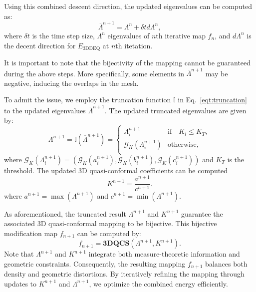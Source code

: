 \documentclass{article}
\begin{document}
Using this combined descent direction, the updated eigenvalues can be computed as:
\begin{equation}
    \overline{\Lambda}^{n+1} = \Lambda^n + \delta t d\Lambda^n,
\end{equation}
where $\delta t$ is the time step size, $\Lambda^n$ eigenvalues of $n$th iterative map $f_n$, and $d\Lambda^n$ is the decent direction for $E_{\text{3DDEQ}}$ at $n$th itetation.

It is important to note that the bijectivity of the mapping cannot be guaranteed during the above steps. More specifically, some elements in $\overline{\Lambda}^{n+1}$ may be negative, inducing the overlaps in the mesh. 

To admit the issue, we employ the truncation function $\mathbb{I}$ in Eq.~\eqref{eqt:truncation} to the updated eigenvalues $\overline{\Lambda}^{n+1}$. The updated truncated eigenvalues are given by:
\begin{equation}\label{eqt:truncation_lambda}
    \Lambda^{n+1} = \mathbb{I} (\overline{\Lambda}^{n+1})=\left \{
    \begin{array}{ll}
     \Lambda_i^{n+1}    & \text{if} \quad K_i \leq K_{T}, \\
     \mathcal{G}_K(\Lambda_i^{n+1})     & \text{otherwise}, \\
    \end{array}  
    \right.
\end{equation}
where $\mathcal{G}_K(\Lambda_i^{n+1}) = \left(\mathcal{G}_K(a_i^{n+1}), \mathcal{G}_K(b_i^{n+1}), \mathcal{G}_K(c_i^{n+1}) \right)$ and $K_{T}$ is the threshold. The updated 3D quasi-conformal coefficients can be computed 
\begin{equation}\label{eqt:update_K}
    K^{n+1} = \frac{a^{n+1}}{c^{n+1}}.
\end{equation}
where $a^{n+1} = \max(\Lambda^{n+1})$ and $c^{n+1} = \min(\Lambda^{n+1})$. 

As aforementioned, the truncated result $\Lambda^{n+1}$ and $K^{n+1}$ guarantee the associated 3D quasi-conformal mapping to be bijective. This bijective modification map $f_{n+1}$ can be computed by:
\begin{equation}\label{eqt:midify_eq}
    f_{n+1} = \textbf{3DQCS}(\Lambda^{n+1}, K^{n+1}).
\end{equation}
Note that $\Lambda^{n+1}$ and $K^{n+1}$ integrate both measure-theoretic information and geometric constraints. Consequently, the resulting mapping $f_{n+1}$ balances both density and geometric distortions. By iteratively refining the mapping through updates to $K^{n+1}$ and $\Lambda^{n+1}$, we optimize the combined energy efficiently.
\end{document}
